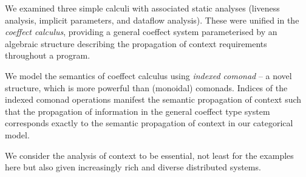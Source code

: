 We examined three simple calculi with associated
static analyses (liveness analysis, implicit parameters, and dataflow
analysis). These were unified in the \emph{coeffect calculus},
providing a general coeffect system parameterised by an
algebraic structure describing the propagation of context
requirements throughout a program.

We model the semantics of coeffect calculus using \emph{indexed comonad} -- a novel structure, which
is more powerful than (monoidal) comonads. Indices of the indexed comonad operations manifest the 
semantic propagation of context such that the propagation of information in the general coeffect
type system corresponds exactly to the semantic propagation of context in our categorical model.

We consider the analysis of context to be essential, not least for the examples here but 
also given increasingly rich and diverse distributed systems.
